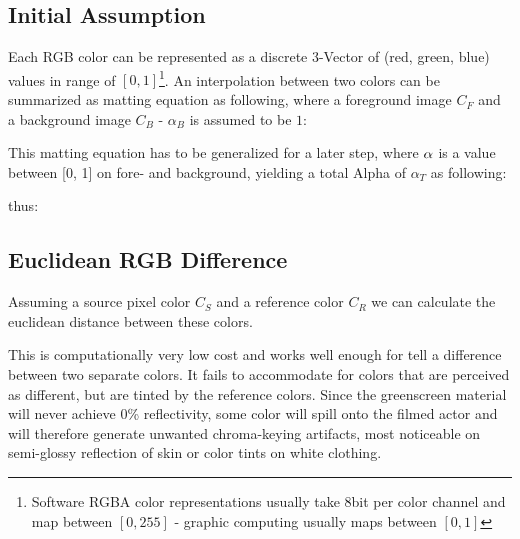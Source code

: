\subsection{Initial Assumption}

Each RGB color can be represented as a discrete 3-Vector of (red, green, blue) 
values in range of $[0, 1]$\footnote{Software RGBA color representations 
usually take 8bit per color channel and map between $[0, 255]$ - graphic 
computing usually maps between $[0, 1]$}. An interpolation between two colors 
can be summarized as matting equation as following, where a foreground image 
$C_F$ and a background image $C_B$ - $\alpha_B$ is assumed to be $1$:


This matting equation has to be generalized for a later step, where 
$\protect\alpha$ is a value between [0, 1] on fore- and background, yielding a 
total Alpha of $\alpha_T$ as following:


thus:


\subsection{Euclidean RGB Difference}
Assuming a source pixel color $C_S$ and a reference color $C_R$ we can 
calculate the euclidean distance between these colors.

This is computationally very low cost and works well enough for tell a 
difference between two separate colors. It fails to accommodate for colors that 
are perceived as different, but are tinted by the reference colors. Since the 
greenscreen material will never achieve 0\% reflectivity, some color will spill 
onto the filmed actor and will therefore generate unwanted chroma-keying 
artifacts, most noticeable on semi-glossy reflection of skin or color tints on 
white clothing.

